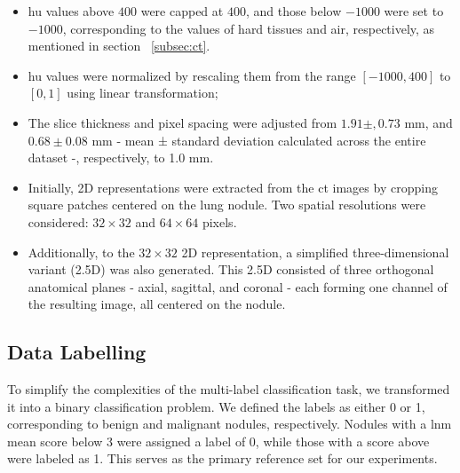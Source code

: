 \begin{itemize}
    \item \ac{hu} values above $400$ were capped at $400$, and those below $-1000$ were set to $-1000$, corresponding to the values of hard tissues and air, respectively, as mentioned in section ~\ref{subsec:ct}.

    \item \ac{hu} values were normalized by rescaling them from the range $[-1000, 400]$ to $[0, 1]$ using linear transformation;

    \item The slice thickness and pixel spacing were adjusted from $1.91 \pm, 0.73$ mm, and $0.68 \pm 0.08$ mm - mean ± standard deviation calculated across the entire dataset -, respectively, to 1.0 mm.

    \item Initially, 2D representations were extracted from the \ac{ct} images by cropping square patches centered on the lung nodule. Two spatial resolutions were considered: $32 \times 32$ and $64 \times 64$ pixels. %

    \item Additionally, to the $32 \times 32$ 2D representation, a simplified three-dimensional variant (2.5D) was also generated. This 2.5D consisted of three orthogonal anatomical planes - axial, sagittal, and coronal - each forming one channel of the resulting image, all centered on the nodule. %


\end{itemize}


\subsection{Data Labelling}

To simplify the complexities of the multi-label classification task, we transformed it into a binary classification problem. We defined the labels as either 0 or 1, corresponding to benign and malignant nodules, respectively. Nodules with a \ac{lnm} mean score below 3 were assigned a label of 0, while those with a score above were labeled as 1. This serves as the primary reference set for our experiments.


